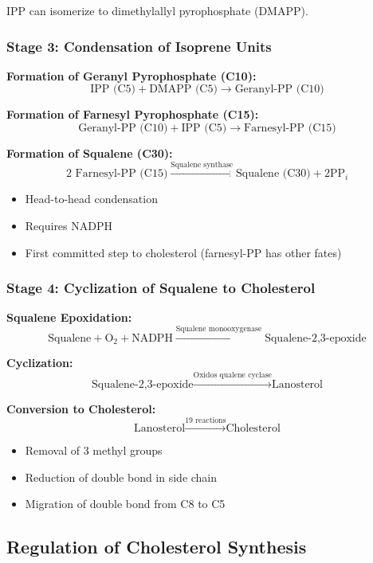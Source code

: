 IPP can isomerize to dimethylallyl pyrophosphate (DMAPP).

\subsubsection{Stage 3: Condensation of Isoprene Units}

\textbf{Formation of Geranyl Pyrophosphate (C10):}
\[
\text{IPP (C5)} + \text{DMAPP (C5)} \rightarrow \text{Geranyl-PP (C10)}
\]

\textbf{Formation of Farnesyl Pyrophosphate (C15):}
\[
\text{Geranyl-PP (C10)} + \text{IPP (C5)} \rightarrow \text{Farnesyl-PP (C15)}
\]

\textbf{Formation of Squalene (C30):}
\[
2 \text{ Farnesyl-PP (C15)} \xrightarrow{\text{Squalene synthase}} \text{Squalene (C30)} + 2\text{PP}_i
\]
\begin{itemize}
    \item Head-to-head condensation
    \item Requires NADPH
    \item First committed step to cholesterol (farnesyl-PP has other fates)
\end{itemize}

\subsubsection{Stage 4: Cyclization of Squalene to Cholesterol}

\textbf{Squalene Epoxidation:}
\[
\text{Squalene} + \text{O}_2 + \text{NADPH} \xrightarrow{\text{Squalene monooxygenase}} \text{Squalene-2,3-epoxide}
\]

\textbf{Cyclization:}
\[
\text{Squalene-2,3-epoxide} \xrightarrow{\text{Oxidos
qualene cyclase}} \text{Lanosterol}
\]

\textbf{Conversion to Cholesterol:}
\[
\text{Lanosterol} \xrightarrow{\text{19 reactions}} \text{Cholesterol}
\]
\begin{itemize}
    \item Removal of 3 methyl groups
    \item Reduction of double bond in side chain
    \item Migration of double bond from C8 to C5
\end{itemize}

\subsection{Regulation of Cholesterol Synthesis}

